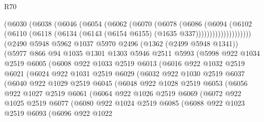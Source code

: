 \begin{lexlean}{R70}
\begin{coremodule}
                (@6030
                  (@6038
                    (@6046
                      (@6054
                        (@6062
                          (@6070
                            (@6078
                              (@6086
                                (@6094
                                  (@6102
                                    (@6110
                                      (@6118
                                        (@6134 (@6143 (@6154 @6155) (@1635 @337))))))))))))))))))))
      (@2490
        @5948
        @5962
        @1037
        @5970
        @2496
        (@1362 (@2499 @5948 @1341))
        (@5977
          @866
          @94
          @1035
          @1301
          @1303
          @5946
          @2511
          @5993
          (@5998
            @922
            @1034
            @2519
            @6005
            (@6008
              @922
              @1033
              @2519
              @6013
              (@6016
                @922
                @1032
                @2519
                @6021
                (@6024
                  @922
                  @1031
                  @2519
                  @6029
                  (@6032
                    @922
                    @1030
                    @2519
                    @6037
                    (@6040
                      @922
                      @1029
                      @2519
                      @6045
                      (@6048
                        @922
                        @1028
                        @2519
                        @6053
                        (@6056
                          @922
                          @1027
                          @2519
                          @6061
                          (@6064
                            @922
                            @1026
                            @2519
                            @6069
                            (@6072
                              @922
                              @1025
                              @2519
                              @6077
                              (@6080
                                @922
                                @1024
                                @2519
                                @6085
                                (@6088
                                  @922
                                  @1023
                                  @2519
                                  @6093
                                  (@6096
                                    @922
                                    @1022

\end{coremodule}
\end{lexlean}
